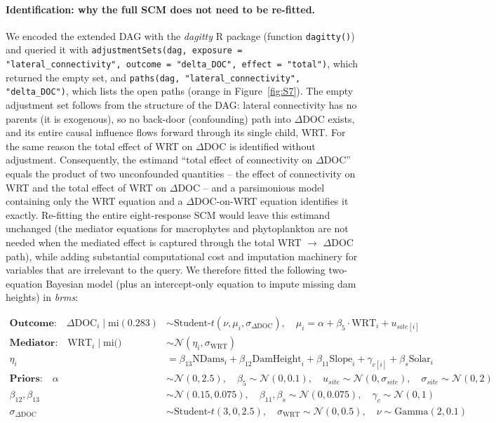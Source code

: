 \documentclass[11pt,a4paper]{article}
\begin{document}
\paragraph{Identification: why the full SCM does not need to be re-fitted.} We encoded the extended DAG with the \emph{dagitty} R package (function \texttt{dagitty()}) and queried it with \texttt{adjustmentSets(dag, exposure = "lateral\_connectivity", outcome = "delta\_DOC", effect = "total")}, which returned the empty set, and \texttt{paths(dag, "lateral\_connectivity", "delta\_DOC")}, which lists the open paths (orange in Figure~\ref{fig:S7}). The empty adjustment set follows from the structure of the DAG: lateral connectivity has no parents (it is exogenous), so no back-door (confounding) path into $\Delta$DOC exists, and its entire causal influence flows forward through its single child, WRT. For the same reason the total effect of WRT on $\Delta$DOC is identified without adjustment. Consequently, the estimand ``total effect of connectivity on $\Delta$DOC'' equals the product of two unconfounded quantities -- the effect of connectivity on WRT and the total effect of WRT on $\Delta$DOC -- and a parsimonious model containing only the WRT equation and a $\Delta$DOC-on-WRT equation identifies it exactly. Re-fitting the entire eight-response SCM would leave this estimand unchanged (the mediator equations for macrophytes and phytoplankton are not needed when the mediated effect is captured through the total WRT $\rightarrow$ $\Delta$DOC path), while adding substantial computational cost and imputation machinery for variables that are irrelevant to the query. We therefore fitted the following two-equation Bayesian model (plus an intercept-only equation to impute missing dam heights) in \emph{brms}:

\begin{equation}
\begin{aligned}
\textbf{Outcome:} \quad \Delta \text{DOC}_i \mid \text{mi}(0.283) &\sim \text{Student-}t(\nu, \mu_i, \sigma_{\Delta \text{DOC}}), \quad \mu_i = \alpha + \beta_5 \cdot \text{WRT}_i + u_{site[i]} \\[0.5em]
\textbf{Mediator:} \quad \text{WRT}_i \mid \text{mi()} &\sim \mathcal{N}(\eta_i, \sigma_{\text{WRT}}) \\
\eta_i &= \beta_{13} \text{NDams}_i + \beta_{12} \text{DamHeight}_i + \beta_{11} \text{Slope}_i + \gamma_{c[i]} + \beta_{s} \text{Solar}_i \\[0.5em]
\textbf{Priors:} \quad \alpha &\sim \mathcal{N}(0, 2.5), \quad \beta_5 \sim \mathcal{N}(0, 0.1), \quad u_{site} \sim \mathcal{N}(0, \sigma_{site}), \quad \sigma_{site} \sim \mathcal{N}(0, 2) \\
\beta_{12}, \beta_{13} &\sim \mathcal{N}(0.15, 0.075), \quad \beta_{11}, \beta_{s} \sim \mathcal{N}(0, 0.075), \quad \gamma_{c} \sim \mathcal{N}(0, 1) \\
\sigma_{\Delta \text{DOC}} &\sim \text{Student-}t(3, 0, 2.5), \quad \sigma_{\text{WRT}} \sim \mathcal{N}(0, 0.5), \quad \nu \sim \text{Gamma}(2, 0.1)
\end{aligned}
\label{eq:altscm}
\end{equation}
\end{document}
